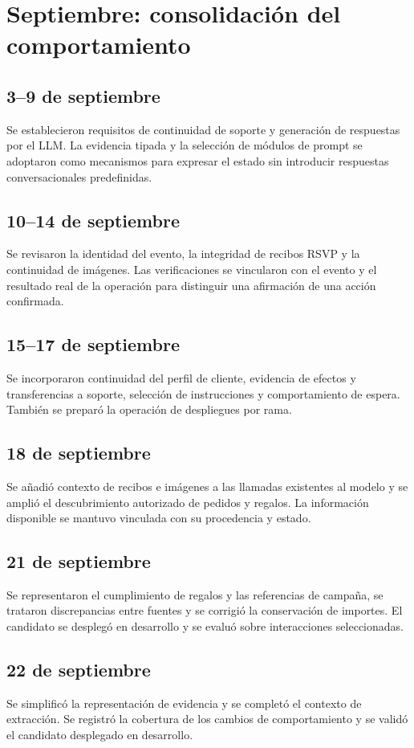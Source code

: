 \documentclass[
	a4paper,
	12pt,
]{CSSullivanBusinessReport}
\begin{document}
\section{Septiembre: consolidación del comportamiento}
\subsection*{3--9 de septiembre}
Se establecieron requisitos de continuidad de soporte y generación de respuestas por el LLM. La evidencia tipada y la selección de módulos de prompt se adoptaron como mecanismos para expresar el estado sin introducir respuestas conversacionales predefinidas.

\subsection*{10--14 de septiembre}
Se revisaron la identidad del evento, la integridad de recibos RSVP y la continuidad de imágenes. Las verificaciones se vincularon con el evento y el resultado real de la operación para distinguir una afirmación de una acción confirmada.

\subsection*{15--17 de septiembre}
Se incorporaron continuidad del perfil de cliente, evidencia de efectos y transferencias a soporte, selección de instrucciones y comportamiento de espera. También se preparó la operación de despliegues por rama.

\subsection*{18 de septiembre}
Se añadió contexto de recibos e imágenes a las llamadas existentes al modelo y se amplió el descubrimiento autorizado de pedidos y regalos. La información disponible se mantuvo vinculada con su procedencia y estado.

\subsection*{21 de septiembre}
Se representaron el cumplimiento de regalos y las referencias de campaña, se trataron discrepancias entre fuentes y se corrigió la conservación de importes. El candidato se desplegó en desarrollo y se evaluó sobre interacciones seleccionadas.

\subsection*{22 de septiembre}
Se simplificó la representación de evidencia y se completó el contexto de extracción. Se registró la cobertura de los cambios de comportamiento y se validó el candidato desplegado en desarrollo.
\end{document}
